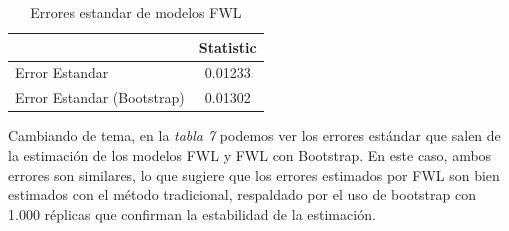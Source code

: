 \documentclass[10pt]{article}
\begin{document}
\begin{table}[htbp] 
    \centering
    \begin{tabular}{lc} 
        \hline
        & Statistic \\ 
        \hline
        Error Estandar & 0.01233 \\ 
        Error Estandar (Bootstrap) & 0.01302 \\ 
        \hline
    \end{tabular}
    \caption{Errores estandar de modelos FWL}
    \label{tab:fwl_errors}
\end{table}

Cambiando de tema, en la \textit{tabla 7} podemos ver los errores estándar que salen de la estimación de los modelos FWL y FWL con Bootstrap. En este caso, ambos errores son  similares, lo que sugiere que los errores estimados por FWL son bien estimados con el método tradicional, respaldado por el uso de bootstrap con 1.000 réplicas que confirman la estabilidad de la estimación. 
\end{document}
